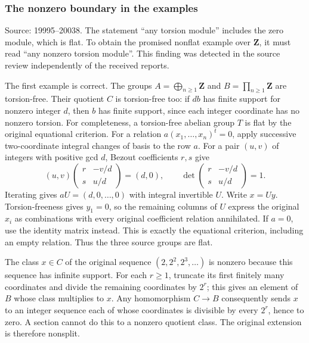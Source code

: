 \subsubsection{The nonzero boundary in the examples}\label{algebra-proof-010-the-nonzero-boundary-in-the-examples}

Source: 19995--20038. The statement ``any torsion module'' includes the zero module, which is flat. To obtain the promised nonflat example over \(\mathbf Z\), it must read ``any nonzero torsion module''. This finding was detected in the source review independently of the received reports.

The first example is correct. The groups \(A=\bigoplus_{n\geq1}\mathbf Z\) and \(B=\prod_{n\geq1}\mathbf Z\) are torsion-free. Their quotient \(C\) is torsion-free too: if \(d b\) has finite support for nonzero integer \(d\), then \(b\) has finite support, since each integer coordinate has no nonzero torsion. For completeness, a torsion-free abelian group \(T\) is flat by the original equational criterion. For a relation \(a(x_1,\ldots,x_n)^t=0\), apply successive two-coordinate integral changes of basis to the row \(a\). For a pair \((u,v)\) of integers with positive gcd \(d\), Bezout coefficients \(r,s\) give \[
(u,v)\begin{pmatrix}r&-v/d\\s&u/d\end{pmatrix}=(d,0),
\qquad \det\begin{pmatrix}r&-v/d\\s&u/d\end{pmatrix}=1.
\] Iterating gives \(aU=(d,0,\ldots,0)\) with integral invertible \(U\). Write \(x=Uy\). Torsion-freeness gives \(y_1=0\), so the remaining columns of \(U\) express the original \(x_i\) as combinations with every original coefficient relation annihilated. If \(a=0\), use the identity matrix instead. This is exactly the equational criterion, including an empty relation. Thus the three source groups are flat.

The class \(x\in C\) of the original sequence \((2,2^2,2^3,\ldots)\) is nonzero because this sequence has infinite support. For each \(r\geq1\), truncate its first finitely many coordinates and divide the remaining coordinates by \(2^r\); this gives an element of \(B\) whose class multiplies to \(x\). Any homomorphism \(C\to B\) consequently sends \(x\) to an integer sequence each of whose coordinates is divisible by every \(2^r\), hence to zero. A section cannot do this to a nonzero quotient class. The original extension is therefore nonsplit.

